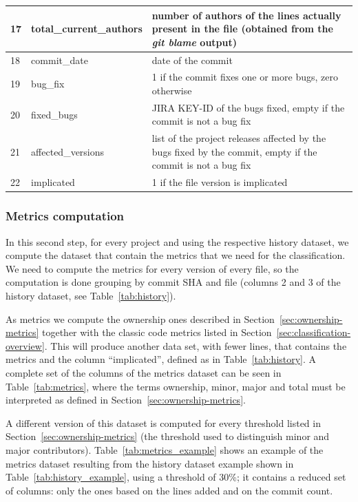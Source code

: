 \begin{table}[ht]
\begin{tabular}{|l|l|p{}|}
17 & total\_current\_authors & 
    number of authors of the lines actually present in the file (obtained from the \textit{git blame} output)\\\hline
18 & commit\_date & date of the commit\\ \hline
19 & bug\_fix & 1 if the commit fixes one or more bugs, zero otherwise\\ \hline
20 & fixed\_bugs & JIRA KEY-ID of the bugs fixed, empty if the commit is not a bug fix\\ \hline
21 & affected\_versions & list of the project releases affected by the bugs fixed by the commit, empty if the commit is not a bug fix\\ \hline
22 & implicated & 1 if the file version is implicated \\ \hline
\end{tabular}
\end{table}

\subsubsection{Metrics computation}
\label{sec:metrics}
In this second step, for every project and using the respective history dataset, we compute the dataset that contain the metrics that we need for the classification. We need to compute the metrics for every version of every file, so the computation is done grouping by commit SHA and file (columns 2 and 3 of the history dataset, see Table~\ref{tab:history}). 

As metrics we compute the ownership ones described in Section~\ref{sec:ownership-metrics} together with the classic code metrics listed in Section~\ref{sec:classification-overview}. This will produce another data set, with fewer lines, that contains the metrics and the column ``implicated'', defined as in Table~\ref{tab:history}. A complete set of the columns of the metrics dataset can be seen in Table~\ref{tab:metrics}, where the terms ownership, minor, major and total must be interpreted as defined in Section~\ref{sec:ownership-metrics}. 

A different version of this dataset is computed for every threshold listed in Section~\ref{sec:ownership-metrics} (the threshold used to distinguish minor and major contributors).
Table~\ref{tab:metrics_example} shows an example of the metrics dataset resulting from the history dataset example shown in Table~\ref{tab:history_example}, using a threshold of 30\%; it contains a reduced set of columns: only the ones based on the lines added and on the commit count.

